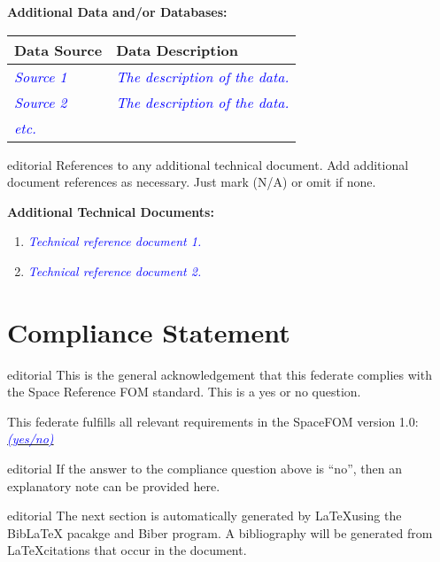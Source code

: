 \documentclass[11pt,english,letterpaper]{article}
\newcommand{\example}[1]{{\textcolor{blue}{\textit{#1}}}}
\begin{document}
\textbf{Additional Data and/or Databases: }

\begin{tabularx}{\textwidth}{|l|X|} \hline
\textbf{Data Source} & \textbf{Data Description} \\ \hline
\example{Source 1} & 
\example{The description of the data.} \\ \hline
\example{Source 2} & 
\example{The description of the data.} \\ \hline
\example{etc.} &  \\ \hline
\end{tabularx}

\begin{shownto}{editorial}
{\color{red} References to any additional technical document. Add additional
document references as necessary. Just mark (N/A) or omit if none.}
\end{shownto}

\textbf{Additional Technical Documents: }
\begin{enumerate}
\item \example{Technical reference document 1.}
\item \example{Technical reference document 2.}
\end{enumerate}


\section*{Compliance Statement}

\begin{shownto}{editorial}
{\color{red} This is the general acknowledgement that this federate complies
with the Space Reference FOM standard. This is a yes or no question.}
\end{shownto}

This federate fulfills all relevant requirements in the SpaceFOM version 1.0: \underline{\example{(yes/no)}}

\begin{shownto}{editorial}
{\color{red} If the answer to the compliance question above is “no”, then an
explanatory note can be provided here.}
\end{shownto}


\begin{shownto}{editorial}
{\color{red} The next section is automatically generated by \LaTeX using the
BibLaTeX pacakge and Biber program.  A bibliography will be generated from
\LaTeX citations that occur in the document.}
\end{shownto}

\printbibliography
\end{document}
